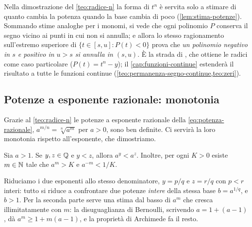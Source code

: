 \begin{osservazione}\label{oss:radice-polinomi}
Nella dimostrazione del \cref{teo:radice-n} la forma di $t^{n}$ è servita solo a
stimare di quanto cambia la potenza quando la base cambia di poco
(\cref{lem:stima-potenze}). Sommando stime analoghe per i monomi, si vede che ogni
polinomio $P$ conserva il segno vicino ai punti in cui non si annulla; e allora lo stesso
ragionamento sull'estremo superiore di $\{t\in[s,u] : P(t)<0\}$ prova che \emph{un
polinomio negativo in $s$ e positivo in $u>s$ si annulla in $(s,u)$}. È la strada di
\cite{giusti}, che ottiene le radici come caso particolare ($P(t)=t^{n}-y$); il
\cref{cap:funzioni-continue} estenderà il risultato a tutte le funzioni continue
(\cref{teo:permanenza-segno-continue,teo:zeri}).
\end{osservazione}

\subsection{Potenze a esponente razionale: monotonia}

Grazie al \cref{teo:radice-n} le potenze a esponente razionale della
\eqref{eq:potenza-razionale}, $a^{m/n}=\sqrt[n]{a^{m}}$ per $a>0$, sono ben definite. Ci
servirà la loro monotonia rispetto all'esponente, che dimostriamo.

\begin{lemma}\label{lem:monotonia-razionale}
Sia $a>1$. Se $y,z\in\mathbb{Q}$ e $y<z$, allora $a^{y}<a^{z}$. Inoltre, per ogni $K>0$ esiste
$m\in\mathbb{N}$ tale che $a^{m}>K$ e $a^{-m}<1/K$.
\end{lemma}

\begin{schema}
\end{schema}

\begin{strategia}
Riduciamo i due esponenti allo stesso denominatore, $y=p/q$ e $z=r/q$ con $p<r$
interi: tutto si riduce a confrontare due potenze \emph{intere} della stessa base
$b=a^{1/q}$, e $b>1$. Per la seconda parte serve una stima dal basso di $a^{m}$ che cresca
illimitatamente con $m$: la disuguaglianza di Bernoulli, scrivendo $a=1+(a-1)$, dà
$a^{m}\ge1+m(a-1)$, e la proprietà di Archimede fa il resto.
\end{strategia}

